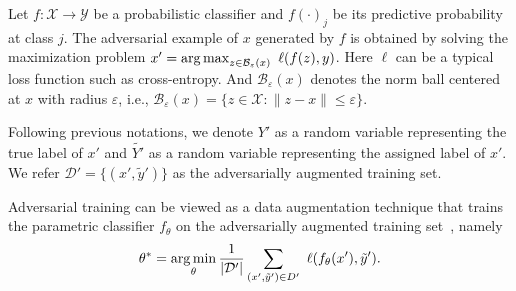     Let $f: \mathcal{X} \rightarrow \mathcal{Y}$ be a probabilistic classifier and $f(\cdot)_j$ be its predictive probability at class $j$.
    The adversarial example of $x$ generated by $f$ is obtained by solving the maximization problem $x' = \operatorname*{arg\,max}_{z \in \mathcal{B}_\varepsilon(x)}~\ell(f(z), y)$.
    Here $\ell$ can be a typical loss function such as cross-entropy. And $\mathcal{B}_\varepsilon (x)$ denotes the norm ball centered at $x$ with radius $\varepsilon$, i.e., $\mathcal{B}_\varepsilon (x) = \{z\in \mathcal{X}: \|z - x\| \le \varepsilon\}$.
    
    Following previous notations, we denote $Y'$ as a random variable representing the true label of $x'$ and $\tilde{Y'}$ as a random variable representing the assigned label of $x'$.
    We refer $\mathcal{D}' = \{(x', \tilde{y}')\}$ as the adversarially augmented training set.
    
    Adversarial training can be viewed as a data augmentation technique that trains the parametric classifier $f_\theta$ on the adversarially augmented training set~\citep{Tsipras2019RobustnessMB}, namely
    \begin{equation}
        \label{eq:outer-minimization}
        \theta^* = \operatorname*{arg\,min}_\theta \frac{1}{|\mathcal{D'}|}\sum_{(x', \tilde{y}') \in D'}~ \ell(f_\theta(x'), \tilde{y}').
    \end{equation}



